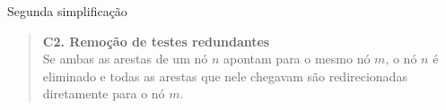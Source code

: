 \expandafter\documentclass\expandafter[table, usenames, svgnames, dvipsnames,14pt, \classopts]{beamer}
\begin{document}
\begin{frame}{Segunda simplificação}
\begin{figure}

    \end{figure}
    
    \begin{quotation}
    \noindent\footnotesize\justifying
        \textbf{C2. Remoção de testes redundantes}\\
        Se ambas as arestas de um nó $n$ apontam para o mesmo nó $m$, o nó $n$ é eliminado e todas as arestas que nele chegavam são redirecionadas diretamente para o nó $m$.
    \end{quotation}
    
\end{frame}
\end{document}
